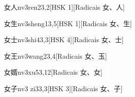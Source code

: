 \begin{entry}{女人}{nv3ren2}{3,2}[HSK 1][Radicais ⼥、⼈]
\end{entry}

\begin{entry}{女生}{nv3sheng1}{3,5}[HSK 1][Radicais ⼥、⽣]
\end{entry}

\begin{entry}{女士}{nv3shi4}{3,3}[HSK 4][Radicais ⼥、⼠]
\end{entry}

\begin{entry}{女王}{nv3wang2}{3,4}[Radicais ⼥、⽟]
\end{entry}

\begin{entry}{女婿}{nv3xu5}{3,12}[Radicais ⼥、⼥]
\end{entry}

\begin{entry}{女子}{nv3 zi3}{3,3}[HSK 3][Radicais ⼥、⼦]
\end{entry}


